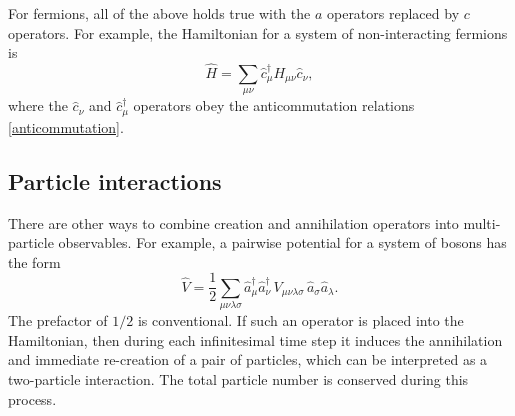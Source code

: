 \documentclass[prx,12pt]{revtex4-2}
\begin{document}
For fermions, all of the above holds true with the $a$ operators
replaced by $c$ operators.  For example, the Hamiltonian for a system
of non-interacting fermions is
\begin{equation}
  \hat{H} = \sum_{\mu\nu} \hat{c}^\dagger_\mu H_{\mu\nu} \hat{c}_\nu,
  \label{twofermionH}
\end{equation}
where the $\hat{c}_\nu$ and $\hat{c}_\mu^\dagger$ operators obey the
anticommutation relations \eqref{anticommutation}.

\subsection{Particle interactions}

There are other ways to combine creation and annihilation operators
into multi-particle observables.  For example, a pairwise potential
for a system of bosons has the form
\begin{equation}
  \hat{V} = \frac{1}{2}
  \sum_{\mu\nu\lambda\sigma} \hat{a}^\dagger_\mu \hat{a}^\dagger_\nu \,
  V_{\mu\nu\lambda\sigma}\, \hat{a}_\sigma \hat{a}_\lambda.
  \label{Vop}
\end{equation}
The prefactor of $1/2$ is conventional.  If such an operator is placed
into the Hamiltonian, then during each infinitesimal time step it
induces the annihilation and immediate re-creation of a pair of
particles, which can be interpreted as a two-particle interaction.
The total particle number is conserved during this process.
\end{document}
